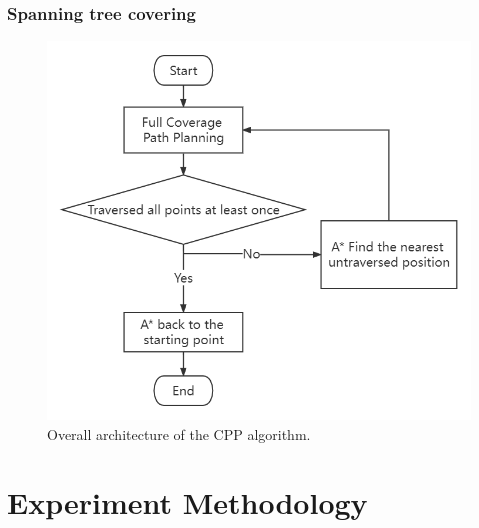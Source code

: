 \documentclass[conference]{IEEEtran}
\begin{document}
\subsubsection{Spanning tree covering}
\begin{figure}[htbp]
\centerline{\includegraphics[scale=0.35]{RS_Report/RS_Report (1).png}}
\caption{Overall architecture of the CPP algorithm.}
\label{fig4}
\end{figure}


\section{Experiment Methodology}
\end{document}

